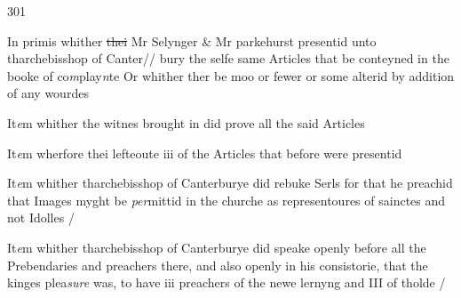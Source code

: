 \documentclass[12pt, a4paper]{book}
\begin{document}
            		\begin{flushright}{\color{Mahogany}301}\end{flushright}


				\marginpar[\vspace{0.5cm}{\textcolor{Gray}{1}}]{}
			
 
		\ifthenelse{\isodd{\thepage}}
		{\reversemarginpar}
		{\normalmarginpar}
		In primis whither \sout{thei }
               Mr Selynger \& Mr parkehurst
			 presentid unto tharchebisshop  of Canter//
bury the selfe same Articles that be conteyned in the booke of co\textit{m}play\textit{n}te
Or whither ther 
			be moo or fewer or some alterid by addition of any 
wourdes
            		
				\marginpar[\vspace{0.5cm}{\textcolor{Gray}{2}}]{}
			

		\ifthenelse{\isodd{\thepage}}
		{\reversemarginpar}
		{\normalmarginpar}
		It\textit{e}m whither the witnes brought in did prove all the said Articles
            		
				\marginpar[\vspace{0.5cm}{\textcolor{Gray}{3}}]{}
			
 
		\ifthenelse{\isodd{\thepage}}
		{\reversemarginpar}
		{\normalmarginpar}
		It\textit{e}m wherfore thei lefteoute iii of the Articles that before were
presentid
            		
				\marginpar[\vspace{0.5cm}{\textcolor{Gray}{4}}]{}
			

		\ifthenelse{\isodd{\thepage}}
		{\reversemarginpar}
		{\normalmarginpar}
		It\textit{e}m whither tharchebisshop  of Canterburye did rebuke Serls
for that he preachid that Images myght be \textit{per}mittid in the churche
as representoures of sainctes and not Idolles /
            		
				\marginpar[\vspace{0.5cm}{\textcolor{Gray}{5}}]{}
			

		\ifthenelse{\isodd{\thepage}}
		{\reversemarginpar}
		{\normalmarginpar}
		It\textit{e}m whither tharchebisshop  of Canterburye did speake openly before
all the Prebendaries and preachers there, and also openly in his 
consistorie, that the kinges plea\textit{sure} was, to have iii preachers of the
newe lernyng and III of tholde /
            			
\end{document}
